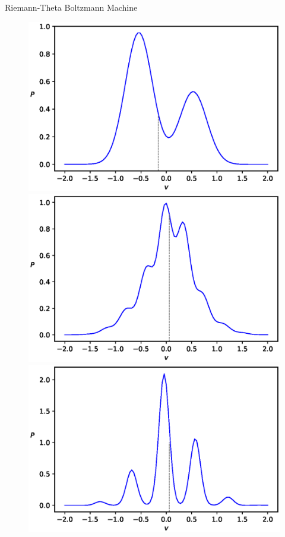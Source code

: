\documentclass[10pt]{beamer}
\begin{document}
\begin{frame}{Riemann-Theta Boltzmann Machine}
\begin{figure}
\begin{center}
          \includegraphics[scale=0.25]{figures/PvPhaseII-1}
          \includegraphics[scale=0.25]{figures/PvPhaseII-2}
          \includegraphics[scale=0.25]{figures/PvPhaseII-3} 
          \label{PvPlots}
        

\end{center}
\end{figure}
\end{frame}
\end{document}
